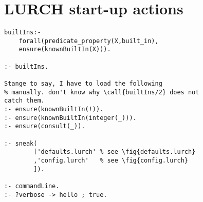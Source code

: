\section{LURCH start-up actions
}
\begin{Verbatim}
builtIns:- 
    forall(predicate_property(X,built_in),
    ensure(knownBuiltIn(X))).

:- builtIns.

Stange to say, I have to load the following
% manually. don't know why \call{builtIns/2} does not
catch them.
:- ensure(knownBuiltIn(!)).          
:- ensure(knownBuiltIn(integer(_))). 
:- ensure(consult(_)).

:- sneak(
        ['defaults.lurch' % see \fig{defaults.lurch}
        ,'config.lurch'   % see \fig{config.lurch}
        ]).

:- commandLine.
:- ?verbose -> hello ; true.
\end{Verbatim}
